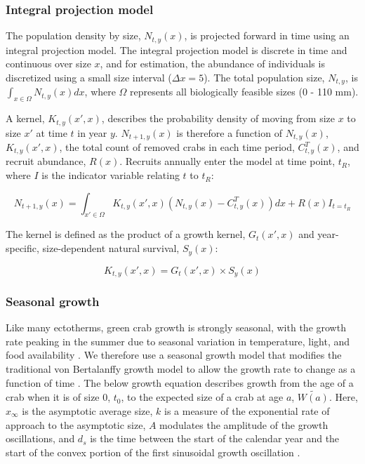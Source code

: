 \documentclass{article}
\begin{document}
\subsubsection*{Integral projection model}

The population density by size, $N_{t, y}(x)$, is projected forward in time using an integral projection model. The integral projection model is discrete in time and continuous over size $x$, and for estimation, the abundance of individuals is discretized using a small size interval ($\Delta x = 5$). The total population size, $N_{t,y}$, is $\int_{x \in \Omega} N_{t, y}(x)dx$, where $\Omega$ represents all biologically feasible sizes (0 - 110 mm).

A kernel, $K_{t,y}(x', x)$, describes the probability density of moving from size $x$ to size $x'$ at time $t$ in year $y$. $N_{t+1,y}(x)$ is therefore a function of $N_{t,y}(x)$, $K_{t,y}(x', x)$, the total count of removed crabs in each time period, $C_{t,y}^T(x)$, and recruit abundance, $R(x)$. Recruits annually enter the model at time point, $t_R$, where $I$ is the indicator variable relating $t$ to $t_R$:

\begin{equation}
N_{t+1,y}(x) = \int_{x' \in \Omega} K_{t,y}(x',x) (N_{t,y}(x) - C_{t,y}^T(x)) dx + R(x)I_{t = t_R}
\end{equation}

The kernel is defined as the product of a growth kernel, $G_t(x',x)$ and year-specific, size-dependent natural survival, $S_y(x)$:

\begin{equation}
K_{t,y}(x',x) = G_t(x',x) \times S_y(x)
\end{equation}

\subsubsection*{Seasonal growth}

Like many ectotherms, green crab growth is strongly seasonal, with the growth rate peaking in the summer due to seasonal variation in temperature, light, and food availability \parencite{contreras2003population, garcia2012technical}. We therefore use a seasonal growth model that modifies the traditional von Bertalanffy growth model to allow the growth rate to change as a function of time \parencite{beverton2012dynamics, somers1988seasonally}. The below growth equation describes growth from the age of a crab when it is of size 0, $t_0$, to the expected size of a crab at age $a$, $\widetilde{W(a)}$. Here, $x_{\infty}$ is the asymptotic average size, $k$ is a measure of the exponential rate of approach to the asymptotic size, $A$ modulates the amplitude of the growth oscillations, and $d_s$ is the time between the start of the calendar year and the start of the convex portion of the first sinusoidal growth oscillation \parencite{garcia2012technical}.
\end{document}

